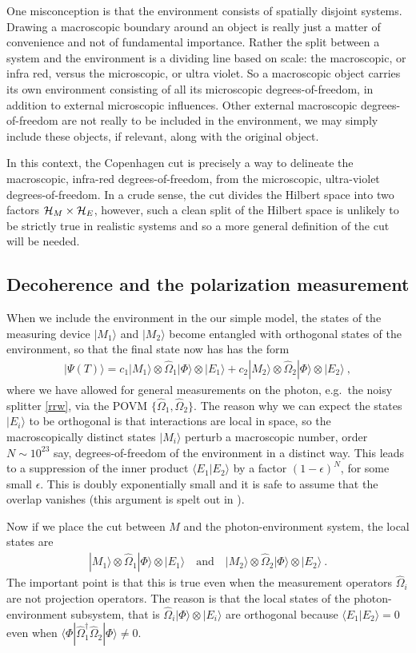 \documentclass[12pt]{article}
\theoremstyle{plain}
\theoremstyle{definition}
\theoremstyle{remark}
\def\BH{{\cal H}}
\def\bra#1{\langle #1|}
\def\ket#1{| #1\rangle}
\newcommand{\EQ}[1]{\begin{equation}\begin{split} #1
\end{split}\end{equation}}
\begin{document}
One misconception is that the environment consists of spatially disjoint systems. Drawing a macroscopic boundary around an object is really just a matter of convenience and not of fundamental importance.
Rather the split between a system and the environment is a dividing line based on scale: the macroscopic, or infra red, versus the microscopic, or ultra violet. So a macroscopic object carries its own environment consisting of all its microscopic degrees-of-freedom, 
in addition to external microscopic influences. Other external macroscopic degrees-of-freedom are not really to be included in the environment, we may simply include these objects, if relevant, along with the original object.

In this context, the Copenhagen cut is precisely a way to delineate the macroscopic, infra-red degrees-of-freedom, from the microscopic, ultra-violet degrees-of-freedom. In a crude sense, the cut divides the Hilbert space into two factors $\BH_M\times\BH_E$, however, such a clean split of the Hilbert space is unlikely to be strictly true in realistic systems and so a more general definition of the cut will be needed.

\subsection{Decoherence and the polarization measurement}

When we include the environment in the our simple
model, the states of the measuring device $\ket{M_1}$ and $\ket{M_2}$ become entangled with orthogonal states of the environment, so that the final state now has has the form
\EQ{
\ket{\Psi(T)}=c_1\ket{M_1}\otimes\hat\Omega_1\ket{\Phi}\otimes\ket{E_1}+
c_2\ket{M_2}\otimes\hat\Omega_2\ket{\Phi}\otimes\ket{E_2}\ ,
}
where we have allowed for general measurements on the photon, e.g.~the noisy splitter \eqref{rrw}, via the POVM $\{\hat\Omega_1,\hat\Omega_2\}$. The reason why we can expect the states $\ket{E_i}$ to be orthogonal is that interactions are local in space, so the macroscopically distinct states $\ket{M_i}$ perturb a macroscopic number, order $N\sim10^{23}$ say, degrees-of-freedom of the environment in a distinct way. This leads to a suppression of the inner product $\bra{E_1}E_2\rangle$ by a factor $(1-\epsilon)^N$, for some small $\epsilon$. This is doubly exponentially small and it is safe to assume that the overlap vanishes (this argument is spelt out in \cite{Banks:2009gw}).

Now if we place the cut between $M$ and the photon-environment system, the local states are
\EQ{
\ket{M_1}\otimes\hat\Omega_1\ket{\Phi}\otimes\ket{E_1}\quad\text{and}\quad
\ket{M_2}\otimes\hat\Omega_2\ket{\Phi}\otimes\ket{E_2}\ .
}
The important point is that this is true even when the measurement operators $\hat\Omega_i$ are not projection operators. The reason is that the local states of the photon-environment subsystem, that is $\hat\Omega_i\ket{\Phi}\otimes\ket{E_i}$
are orthogonal because $\bra{E_1}E_2\rangle=0$ even when $\bra{\Phi}\hat\Omega_1^\dagger\hat\Omega_2\ket{\Phi}\neq0$.
\end{document}
